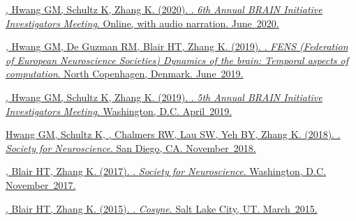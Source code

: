 \begin{description}[itemsep=8pt]
  \item[\quad]
    \href{https://www.cvent.com/events/6th-annual-brain-initiative-investigators-meeting/custom-116-4e2aadaa6cd549a3a4b53113cd172ad2.aspx}
    {, Hwang GM, Schultz K, Zhang K. (2020).
    . \emph{6th Annual BRAIN Initiative
    Investigators Meeting}. Online, with audio narration. June~2020.}
  \item[\quad]
    \href{https://www.fens.org/Meetings/The-Brain-Conferences/Dynamics-of-the-brain/}
    {, Hwang GM, De Guzman RM, Blair HT, Zhang K. (2019).
    . \emph{FENS (Federation of
        European Neuroscience Societies) Dynamics of the brain: Temporal aspects of
    computation}. North Copenhagen, Denmark. June~2019.}
  \item[\quad]
    \href{https://www.cvent.com/events/5th-annual-brain-initiative-investigators-meeting/event-summary-de9c0d8f934b46eb8d80b55bcfbfe96a.aspx}
    {, Hwang GM, Schultz K, Zhang K. (2019).
    . \emph{5th Annual BRAIN Initiative Investigators Meeting}.
    Washington, D.C. April~2019.} 
  \item[\quad]
    \href{https://abstractsonline.com/pp8/#!/4649/presentation/10884}
    {Hwang GM, Schultz K, , Chalmers RW, Lau SW, Yeh BY,
      Zhang K. (2018). . \emph{Society for Neuroscience}.
    San Diego, CA. November~2018.}
  \item[\quad]
    \href{https://www.abstractsonline.com/pp8/#!/4376/presentation/6085}
    {, Blair HT, Zhang K. (2017). . \emph{Society for Neuroscience}.
    Washington, D.C. November~2017.}
  \item[\quad]
    \href{https://jdmonaco.com/files/monaco-paper-cosyne15.pdf}
    {, Blair HT, Zhang K. (2015). . \emph{Cosyne}. Salt Lake City, UT. March~2015.}

\end{description}
